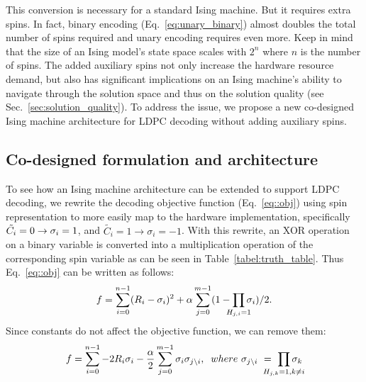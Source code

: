 This conversion is necessary for a standard Ising machine. But it requires
extra spins. In fact, binary encoding (Eq.~\ref{eq:unary_binary}) almost
doubles the total number of spins required and unary encoding requires even
more. Keep in mind that the size of an Ising model's state space scales with
$2^n$ where $n$ is the number of spins. The added auxiliary spins not only
increase the hardware resource demand, but also has significant implications
on an Ising machine's ability to navigate through the solution space and thus
on the solution quality (see Sec.~\ref{sec:solution_quality}). To address the 
issue, we propose a new co-designed Ising machine architecture for LDPC decoding
without adding auxiliary spins. 

\subsection {Co-designed formulation and architecture}\label{secc:m_qubo} 

To see how an Ising machine architecture can be extended to support LDPC
decoding, we rewrite the decoding objective function (Eq.~\ref{eq::obj})
using spin representation to more easily map to the hardware implementation,
specifically $\Tilde{C_i}=0\rightarrow\sigma_i=1$, and 
$\tilde{C_i}=1\rightarrow \sigma_i=-1$.
With this rewrite, an XOR operation on a binary variable is converted into 
a multiplication operation of the corresponding spin variable as can be
seen in Table~\ref{tabel:truth_table}. 
Thus Eq.~\ref{eq::obj} can be written as follows:
\begin{equation}
\label{eq::mul_obj}
\begin{split}
    f = \sum_{i=0}^{n-1}(R_i - \sigma_i)^2  + \alpha \sum_{j=0}^{m-1}(1-\prod_{\mathclap{ H_{j,i}=1}} \sigma_i)/2.
\end{split}
\end{equation}
Since constants do not affect the objective function, we can remove them:
\begin{equation}
\label{eq::LDPC_ising}
\begin{split}
    f =  \sum_{i=0}^{n-1}-2R_i\sigma_i  -\frac{\alpha}{2}\sum_{j=0}^{m-1} 
    \sigma_i \sigma_{j\backslash i},\;\;
    where\ \sigma_{j\backslash i}\ =\ \prod_{\mathclap{H_{j,k}=1, k\neq i} } \sigma_k
\end{split}
\end{equation}

